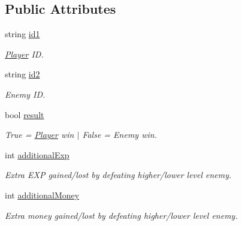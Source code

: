 \subsection*{Public Attributes}
\begin{DoxyCompactItemize}
\item 
\mbox{\label{class_battle_result_a350ad6a31cf445647adc770788444832}} 
string \mbox{\hyperlink{class_battle_result_a350ad6a31cf445647adc770788444832}{id1}}
\begin{DoxyCompactList}\small\item\em \mbox{\hyperlink{class_player}{Player}} ID. \end{DoxyCompactList}\item 
\mbox{\label{class_battle_result_ae2c787e74297c842bf4e284f0cc612fb}} 
string \mbox{\hyperlink{class_battle_result_ae2c787e74297c842bf4e284f0cc612fb}{id2}}
\begin{DoxyCompactList}\small\item\em Enemy ID. \end{DoxyCompactList}\item 
\mbox{\label{class_battle_result_afd1e0eda93aa975e42f89c2eb3ce0fdc}} 
bool \mbox{\hyperlink{class_battle_result_afd1e0eda93aa975e42f89c2eb3ce0fdc}{result}}
\begin{DoxyCompactList}\small\item\em True = \mbox{\hyperlink{class_player}{Player}} win $\vert$ False = Enemy win. \end{DoxyCompactList}\item 
\mbox{\label{class_battle_result_afc0db86910169071de1574e338681970}} 
int \mbox{\hyperlink{class_battle_result_afc0db86910169071de1574e338681970}{additional\+Exp}}
\begin{DoxyCompactList}\small\item\em Extra E\+XP gained/lost by defeating higher/lower level enemy. \end{DoxyCompactList}\item 
\mbox{\label{class_battle_result_a41b75012dae886cb26753404c5ff9dcd}} 
int \mbox{\hyperlink{class_battle_result_a41b75012dae886cb26753404c5ff9dcd}{additional\+Money}}
\begin{DoxyCompactList}\small\item\em Extra money gained/lost by defeating higher/lower level enemy. \end{DoxyCompactList}\end{DoxyCompactItemize}
